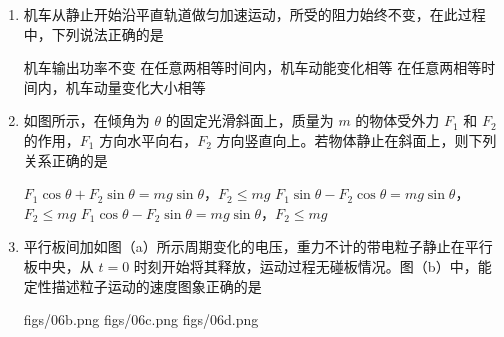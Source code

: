 \documentclass[\gkver]{gaokaozhenti}
\begin{document}
\begin{enumerate}

\item
机车从静止开始沿平直轨道做匀加速运动，所受的阻力始终不变，在此过程中，下列说法正确的是

{机车输出功率不变}
{在任意两相等时间内，机车动能变化相等}
{在任意两相等时间内，机车动量变化大小相等}


\item
如图所示，在倾角为 $\theta$ 的固定光滑斜面上，质量为 $m$ 的物体受外力 $F_{1}$ 和 $F_{2}$ 的作用，$F_{1}$ 方向水平向右，$F_{2}$ 方向竖直向上。若物体静止在斜面上，则下列关系正确的是


{$F_{1}\cos\theta+F_{2}\sin\theta=mg\sin\theta$，$F_{2}\leq mg$}
{$F_{1}\sin\theta-F_{2}\cos\theta=mg\sin\theta$，$F_{2}\leq mg$}
{$F_{1}\cos\theta-F_{2}\sin\theta=mg\sin\theta$，$F_{2}\leq mg$}


\item
平行板间加如图（a）所示周期变化的电压，重力不计的带电粒子静止在平行板中央，从 $t=0$ 时刻开始将其释放，运动过程无碰板情况。图（b）中，能定性描述粒子运动的速度图象正确的是


{figs/06b.png}
{figs/06c.png}
{figs/06d.png}



\end{enumerate}
\end{document}
